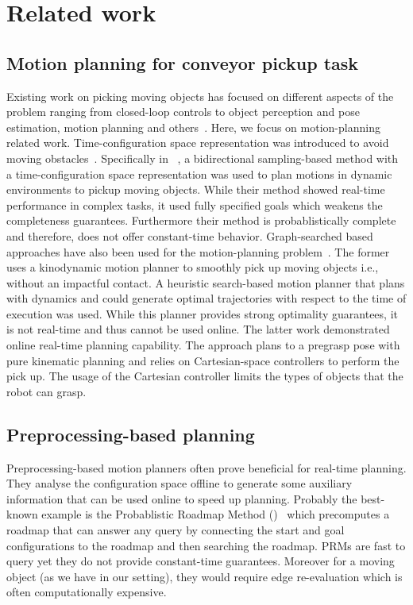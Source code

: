 \documentclass[conference]{IEEEtran}
\begin{document}
\section{Related work}
\subsection{Motion planning for conveyor pickup task}
Existing work on picking moving objects has focused on different aspects of the problem ranging from closed-loop controls to object perception and pose estimation, motion planning and others~\cite{allen1993automated, han2019toward, stogl2017tracking, zhang2018gilbreth}. 
%
Here, we focus on motion-planning related work. Time-configuration space representation was introduced to avoid moving obstacles~\cite{fraichard1993dynamic,cefalo2013task,yang2018planning}. Specifically in ~\cite{yang2018planning}, a bidirectional sampling-based method with a time-configuration space representation was used to plan motions in dynamic environments to pickup moving objects. While their method showed real-time performance in complex tasks, it used fully specified goals which weakens the completeness guarantees. Furthermore their method is probablistically complete and therefore, does not offer constant-time behavior.
Graph-searched based approaches have also been used for the motion-planning problem~\cite{cowley2013perception, menon2014motion}. The former uses a kinodynamic motion planner to smoothly pick up moving objects i.e., without an impactful contact. A heuristic search-based motion planner that plans with dynamics and could generate optimal trajectories with respect to the time of execution was used. While this planner provides strong optimality guarantees, it is not real-time and thus cannot be used online.
%
The latter work demonstrated online real-time planning capability. The approach plans to a pregrasp pose with pure kinematic planning and relies on Cartesian-space controllers to perform the pick up. The usage of the Cartesian controller limits the types of objects that the robot can grasp.


\subsection{Preprocessing-based planning}
Preprocessing-based motion planners often prove beneficial for real-time planning. They analyse the configuration space offline to generate some auxiliary information that can be used online to speed up planning. 
Probably the best-known example is the Probablistic Roadmap Method ()~\cite{kavraki1996probabilistic} which precomputes a roadmap that can answer any query by connecting the start and goal configurations to the roadmap and then searching the roadmap. \textsf{PRM}s are fast to query yet they do not provide constant-time guarantees.
Moreover for a moving object (as we have in our setting), they would require edge re-evaluation which is often computationally expensive.
%
\end{document}
